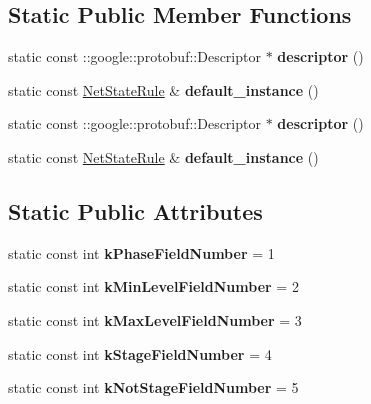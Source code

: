 \subsection*{Static Public Member Functions}
\begin{DoxyCompactItemize}
\item 
\mbox{\label{classcaffe_1_1_net_state_rule_a74a93bb7b071fa59ee75b5647652209a}} 
static const \+::google\+::protobuf\+::\+Descriptor $\ast$ {\bfseries descriptor} ()
\item 
\mbox{\label{classcaffe_1_1_net_state_rule_a69ec6c55f75e653355c3210fcea192eb}} 
static const \mbox{\hyperlink{classcaffe_1_1_net_state_rule}{Net\+State\+Rule}} \& {\bfseries default\+\_\+instance} ()
\item 
\mbox{\label{classcaffe_1_1_net_state_rule_ae69c75744570ad2eacea9c3b19b86e2d}} 
static const \+::google\+::protobuf\+::\+Descriptor $\ast$ {\bfseries descriptor} ()
\item 
\mbox{\label{classcaffe_1_1_net_state_rule_af96729b2aa71a94ff96825a9e8a44a33}} 
static const \mbox{\hyperlink{classcaffe_1_1_net_state_rule}{Net\+State\+Rule}} \& {\bfseries default\+\_\+instance} ()
\end{DoxyCompactItemize}
\subsection*{Static Public Attributes}
\begin{DoxyCompactItemize}
\item 
\mbox{\label{classcaffe_1_1_net_state_rule_aa469442723398ca1b79e71ab166cfafd}} 
static const int {\bfseries k\+Phase\+Field\+Number} = 1
\item 
\mbox{\label{classcaffe_1_1_net_state_rule_a01d743a98408e0453b4f01cfaac3c321}} 
static const int {\bfseries k\+Min\+Level\+Field\+Number} = 2
\item 
\mbox{\label{classcaffe_1_1_net_state_rule_a5e60aaae8d62a8e33fba465682bc8207}} 
static const int {\bfseries k\+Max\+Level\+Field\+Number} = 3
\item 
\mbox{\label{classcaffe_1_1_net_state_rule_a7c4dda4c65efaa228fcd33f93e4c492c}} 
static const int {\bfseries k\+Stage\+Field\+Number} = 4
\item 
\mbox{\label{classcaffe_1_1_net_state_rule_a522ebe1f768592acda4a43a3853126bf}} 
static const int {\bfseries k\+Not\+Stage\+Field\+Number} = 5
\end{DoxyCompactItemize}
